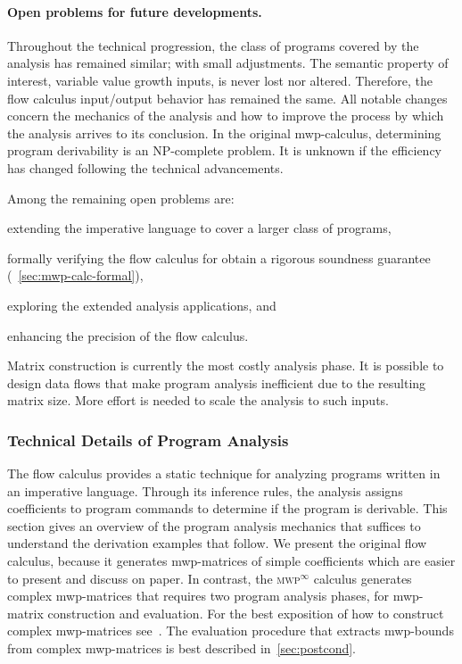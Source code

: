 \paragraph*{Open problems for future developments.}
Throughout the technical progression, the class of programs covered by the analysis has remained similar;
with small adjustments.
The semantic property of interest, variable value growth \wrt inputs, is never lost nor altered.
Therefore, the flow calculus input/output behavior has remained the same.
All notable changes concern the mechanics of the analysis and how to improve the process by which the analysis arrives to its conclusion.
In the original mwp-calculus, determining program derivability is an NP-complete problem.
It is unknown if the efficiency has changed following the technical advancements.

Among the remaining open problems are:
\begin{enumerate*}
\item extending the imperative language to cover a larger class of programs,
\item formally verifying the flow calculus for obtain a rigorous soundness guarantee (\cf~\autoref{sec:mwp-calc-formal}),
\item exploring the extended analysis applications, and
\item enhancing the precision of the flow calculus.
\end{enumerate*}
Matrix construction is currently the most costly analysis phase.
It is possible to design data flows that make program analysis inefficient due to the resulting matrix size.
More effort is needed to scale the analysis to such inputs.

\subsubsection{Technical Details of Program Analysis}
\label{mwp-analysis}

The flow calculus provides a static technique for analyzing programs written in an imperative language.
Through its inference rules, the analysis assigns coefficients to program commands to determine if the program is derivable.
This section gives an overview of the program analysis mechanics that suffices to understand the derivation examples that follow.
We present the original flow calculus, because it generates mwp-matrices of simple coefficients which are easier to present and discuss on paper.
In contrast, the \textsc{mwp}\(^\infty\) calculus generates complex mwp-matrices that requires two program analysis phases, for mwp-matrix construction and evaluation.
For the best exposition of how to construct complex mwp-matrices see~.
The evaluation procedure that extracts mwp-bounds from complex mwp-matrices is best described in~\autoref{sec:postcond}.

